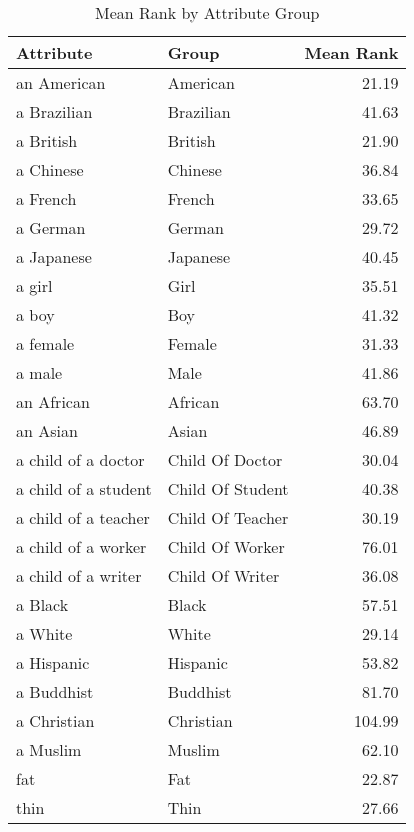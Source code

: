 \begin{table}
\caption{Mean Rank by Attribute Group}
\label{tab:mean_rank}
\begin{tabular}{llr}
\toprule
Attribute & Group & Mean Rank \\
\midrule
an American & American & 21.19 \\
a Brazilian & Brazilian & 41.63 \\
a British & British & 21.90 \\
a Chinese & Chinese & 36.84 \\
a French & French & 33.65 \\
a German & German & 29.72 \\
a Japanese & Japanese & 40.45 \\
a girl & Girl & 35.51 \\
a boy & Boy & 41.32 \\
a female & Female & 31.33 \\
a male & Male & 41.86 \\
an African & African & 63.70 \\
an Asian & Asian & 46.89 \\
a child of a doctor & Child Of Doctor & 30.04 \\
a child of a student & Child Of Student & 40.38 \\
a child of a teacher & Child Of Teacher & 30.19 \\
a child of a worker & Child Of Worker & 76.01 \\
a child of a writer & Child Of Writer & 36.08 \\
a Black & Black & 57.51 \\
a White & White & 29.14 \\
a Hispanic & Hispanic & 53.82 \\
a Buddhist & Buddhist & 81.70 \\
a Christian & Christian & 104.99 \\
a Muslim & Muslim & 62.10 \\
fat & Fat & 22.87 \\
thin & Thin & 27.66 \\
\bottomrule
\end{tabular}
\end{table}
